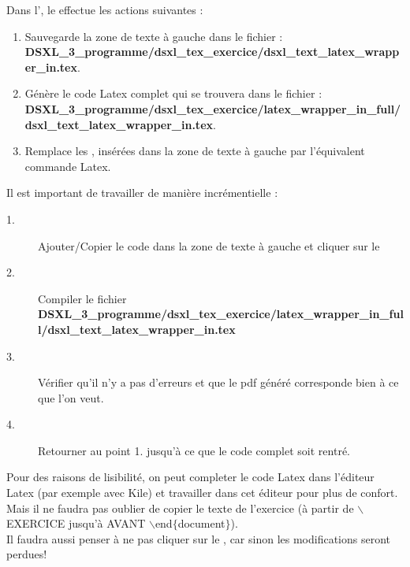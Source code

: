 \begin{dsxl}
 Dans l', le  effectue les actions suivantes :
 \begin{enumerate}
  \item Sauvegarde la zone de texte à gauche dans le fichier :\\
   {\bf DSXL\_3\_programme/dsxl\_tex\_exercice/dsxl\_text\_latex\_wrapper\_in.tex}. 
   \item Génère le code Latex complet qui se trouvera dans le fichier : \\
 {\bf DSXL\_3\_programme/dsxl\_tex\_exercice/latex\_wrapper\_in\_full/dsxl\_text\_latex\_wrapper\_in.tex}. 
 \item Remplace les ,  insérées dans la zone de texte à gauche par l'équivalent commande Latex.  
  
 \end{enumerate}

 
 
 Il est important de travailler de manière incrémentielle : 
 \begin{description}
  \item [1.] Ajouter/Copier le code dans la zone de texte à gauche et cliquer sur le 
  \item[2.] Compiler le fichier \\
        {\bf\small DSXL\_3\_programme/dsxl\_tex\_exercice/latex\_wrapper\_in\_full/dsxl\_text\_latex\_wrapper\_in.tex}
  \item[3.] Vérifier qu'il n'y a pas d'erreurs et que le pdf généré corresponde bien à ce que l'on veut. 
  \item[4.] Retourner au point 1. jusqu'à ce que le code complet soit rentré. 
 \end{description}
\end{dsxl}

\begin{remarque}
 Pour des raisons de lisibilité, on peut completer le code Latex dans l'éditeur Latex (par exemple avec Kile) et travailler dans cet éditeur pour plus de confort. 
 Mais il ne faudra pas oublier de copier le texte de l'exercice (à partir de $\backslash$EXERCICE jusqu'à AVANT  $\backslash$end$\{$document$\}$). \\
 Il faudra aussi penser à ne pas cliquer sur le , car sinon les modifications seront perdues! 
\end{remarque}


